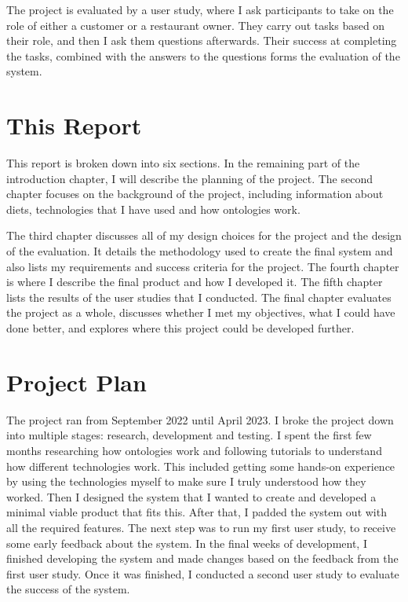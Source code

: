 The project is evaluated by a user study, where I ask participants to take on the role of either a customer or a restaurant owner. They carry out tasks based on their role, and then I ask them questions afterwards. Their success at completing the tasks, combined with the answers to the questions forms the evaluation of the system.

\section{This Report}

This report is broken down into six sections. In the remaining part of the introduction chapter, I will describe the planning of the project. The second chapter focuses on the background of the project, including information about diets, technologies that I have used and how ontologies work.

The third chapter discusses all of my design choices for the project and the design of the evaluation. It details the methodology used to create the final system and also lists my requirements and success criteria for the project. The fourth chapter is where I describe the final product and how I developed it. The fifth chapter lists the results of the user studies that I conducted. The final chapter evaluates the project as a whole, discusses whether I met my objectives, what I could have done better, and explores where this project could be developed further.

\section{Project Plan}

The project ran from September 2022 until April 2023. I broke the project down into multiple stages: research, development and testing. I spent the first few months researching how ontologies work and following tutorials to understand how different technologies work. This included getting some hands-on experience by using the technologies myself to make sure I truly understood how they worked. Then I designed the system that I wanted to create and developed a minimal viable product that fits this. After that, I padded the system out with all the required features. The next step was to run my first user study, to receive some early feedback about the system. In the final weeks of development, I finished developing the system and made changes based on the feedback from the first user study. Once it was finished, I conducted a second user study to evaluate the success of the system.


